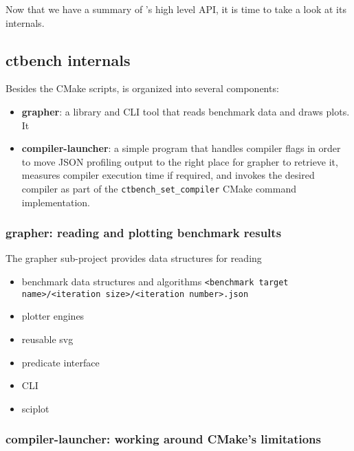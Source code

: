 \documentclass[../main]{subfiles}
\begin{document}
Now that we have a summary of \ctbench's high level API, it is time to take a
look at its internals.

\subsection{
  ctbench internals
}

Besides the CMake scripts, \ctbench is organized into several components:

\begin{itemize}

\item
\textbf{grapher}: a \cpp library and CLI tool that reads benchmark data
and draws plots. It

\item
\textbf{compiler-launcher}: a simple program that handles compiler flags in
order to move JSON profiling output to the right place for grapher
to retrieve it, measures compiler execution time if required, and invokes the
desired compiler as part of the \lstinline{ctbench_set_compiler} CMake
command implementation.

\end{itemize}

\subsubsection{
  grapher: reading and plotting benchmark results
}

The grapher sub-project provides data structures for reading

\begin{itemize}
\item
benchmark data structures and algorithms
\lstinline{<benchmark target name>/<iteration size>/<iteration number>.json}

\item
plotter engines

\item
reusable svg

\item
predicate interface

\item
CLI

\item
sciplot

\end{itemize}

\subsubsection{
  compiler-launcher: working around CMake's limitations
}
\end{document}
